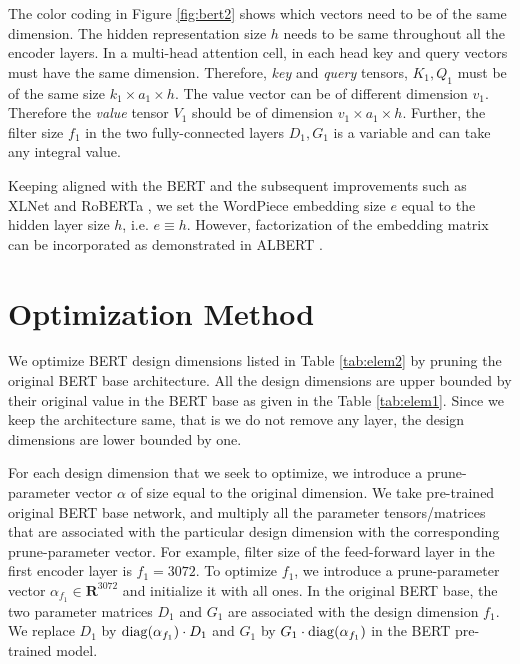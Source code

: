\documentclass[11pt,a4paper]{article}
\newcommand{\zk}[1]{{\color{blue}ZK:#1}} %
\begin{document}
The color coding in Figure \ref{fig:bert2} shows which vectors need to be of the same dimension. The hidden representation size $h$ needs to be same throughout all the encoder layers. In a multi-head attention cell, in each head key and query vectors must have the same dimension. Therefore, {\em key} and {\em query} tensors, $K_1, Q_1$ must be of the same size $k_1\times a_1 \times h$. The value vector can be of different dimension $v_1$. Therefore the {\em value} tensor $V_1$ should be of dimension $v_1\times a_1 \times h$.  Further, the filter size $f_1$ in the two fully-connected layers $D_1, G_1$ is a variable and can take any integral value. 

Keeping aligned with the BERT and the subsequent improvements such as XLNet \citep{yang2019xlnet} and RoBERTa \citep{liu2019roberta}, we set the WordPiece embedding size $e$ equal to the hidden layer size $h$, i.e. $e \equiv h$. However, factorization of the embedding matrix can be incorporated as demonstrated in ALBERT \citep{lan2019albert}. 


\section{Optimization Method}
We optimize BERT design dimensions listed in Table \ref{tab:elem2} by pruning the original BERT base architecture. All the design dimensions are upper bounded by their original value in the BERT base as given in the Table \ref{tab:elem1}. Since we keep the architecture same, that is we do not remove any layer, the design dimensions are lower bounded by one. 

For each design dimension that we seek to optimize, we introduce a prune-parameter vector $\alpha$ of size equal to the original dimension. We take pre-trained original BERT base network, and multiply all the parameter tensors/matrices that are associated with the particular design dimension with the corresponding prune-parameter vector. For example, filter size of the feed-forward layer in the first encoder layer is $f_1 = 3072$. To optimize $f_1$, we introduce a prune-parameter vector $\alpha_{f_1} \in \mathbf{R}^{3072}$ and initialize it with all ones. In the original BERT base, the two parameter matrices $D_1$ and  $G_1$ are associated with the design dimension $f_1$. 
We replace $D_1$ by ${\rm diag}(\alpha_{f_1}) \cdot D_1$ and 
$G_1$ by $G_1 \cdot {\rm diag}(\alpha_{f_1})$ in the BERT pre-trained model.
\end{document}
